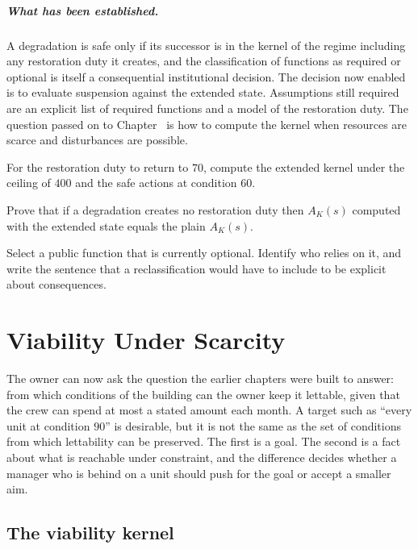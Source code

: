 \paragraph{What has been established.} A degradation is safe only if its successor is in the kernel of the regime including any restoration duty it creates, and the classification of functions as required or optional is itself a consequential institutional decision. The decision now enabled is to evaluate suspension against the extended state. Assumptions still required are an explicit list of required functions and a model of the restoration duty. The question passed on to Chapter~ is how to compute the kernel when resources are scarce and disturbances are possible.

\begin{exercise}
For the restoration duty to return to $70$, compute the extended kernel under the ceiling of $400$ and the safe actions at condition $60$.
\end{exercise}
\begin{exercise}
Prove that if a degradation creates no restoration duty then $A_K(s)$ computed with the extended state equals the plain $A_K(s)$.
\end{exercise}
\begin{exercise}
Select a public function that is currently optional. Identify who relies on it, and write the sentence that a reclassification would have to include to be explicit about consequences.
\end{exercise}

\chapter{Viability Under Scarcity}\label{ch:13}

The owner can now ask the question the earlier chapters were built to answer: from which conditions of the building can the owner keep it lettable, given that the crew can spend at most a stated amount each month. A target such as ``every unit at condition $90$'' is desirable, but it is not the same as the set of conditions from which lettability can be preserved. The first is a goal. The second is a fact about what is reachable under constraint, and the difference decides whether a manager who is behind on a unit should push for the goal or accept a smaller aim.

\section{The viability kernel}

